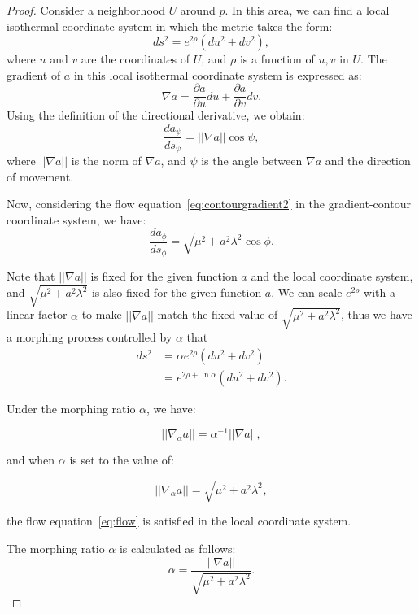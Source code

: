 \documentclass{article}
\numberwithin{definition}{section}
\numberwithin{lemma}{section}
\numberwithin{proposition}{section}
\numberwithin{corollary}{section}
\numberwithin{theorem}{section}
\begin{document}
\begin{proof}
    Consider a neighborhood \( U \) around \( p \).
    In this area, we can find a local isothermal coordinate system in which the metric takes the form:
    \[ ds^2 = e^{2\rho}(du^2 + dv^2), \]
    where \( u \) and \( v \) are the coordinates of \( U \), and \( \rho \) is a function of \( u, v \) in \( U \).
    The gradient of \( a \) in this local isothermal coordinate system is expressed as:
    \[ \nabla a = \frac{\partial a}{\partial u} du + \frac{\partial a}{\partial v} dv. \]
    Using the definition of the directional derivative, we obtain:
    \[ \frac{da_{\psi}}{ds_{\psi}} = ||\nabla a|| \cos \psi, \]
    where \( ||\nabla a|| \) is the norm of \( \nabla a \), and \( \psi \) is the angle between \( \nabla a \) and the direction of movement.

    Now, considering the flow equation~\ref{eq:contourgradient2} in the gradient-contour coordinate system, we have:
    \[ \frac{da_{\phi}}{ds_{\phi}} = \sqrt{\mu^2 + a^2 \lambda^2} \cos \phi. \]

    Note that \( ||\nabla a|| \) is fixed for the given function \( a \) and the local coordinate system, and \( \sqrt{\mu^2 + a^2 \lambda^2} \) is also fixed for the given function \( a \).
    We can scale \( e^{2\rho} \) with a linear factor \( \alpha \) to make \( ||\nabla a|| \) match the fixed value of \( \sqrt{\mu^2 + a^2 \lambda^2} \),
    thus we have a morphing process controlled by \( \alpha \) that
    \begin{align}
        ds^2 &= \alpha e^{2 \rho}(du^2 + dv^2)\label{eq:morphing} \\
        &= e^{2 \rho + \ln \alpha}(du^2 + dv^2).
    \end{align}

    Under the morphing ratio \( \alpha \), we have:

    \begin{equation}
        ||\nabla_\alpha a|| = \alpha^{-1} ||\nabla a||,
    \end{equation}

    and when \( \alpha \) is set to the value of:

    \[ ||\nabla_\alpha a|| = \sqrt{\mu^2 + a^2 \lambda^2}, \]

    the flow equation~\eqref{eq:flow} is satisfied in the local coordinate system.

    The morphing ratio \( \alpha \) is calculated as follows:
    \begin{equation}
        \alpha = \frac{||\nabla a||}{\sqrt{\mu^2 + a^2 \lambda^2}}\label{eq:ratio}.
    \end{equation}
    \qedhere

\end{proof}
\end{document}
